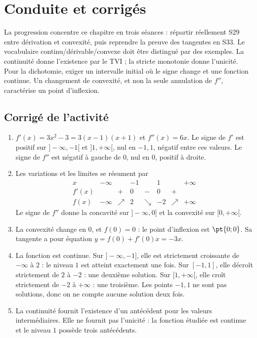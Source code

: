 \ifmxteacher\mxnewpage\section{Conduite et corrigés}\begin{teachernote}La progression concentre ce chapitre en trois séances : répartir réellement S29 entre dérivation et convexité, puis reprendre la preuve des tangentes en S33. Le vocabulaire continu/dérivable/convexe doit être distingué par des exemples. La continuité donne l'existence par le TVI ; la stricte monotonie donne l'unicité. Pour la dichotomie, exiger un intervalle initial où le signe change et une fonction continue. Un changement de convexité, et non la seule annulation de $f''$, caractérise un point d'inflexion.\end{teachernote}

\subsection{Corrigé de l'activité}\begin{enumerate}
\item $f'(x)=3x^2-3=3(x-1)(x+1)$ et $f''(x)=6x$. Le signe de $f'$ est positif sur $]-\infty,-1[$ et $]1,+\infty[$, nul en $-1,1$, négatif entre ces valeurs. Le signe de $f''$ est négatif à gauche de $0$, nul en $0$, positif à droite.
\item Les variations et les limites se résument par
\[\begin{array}{c|ccccccc}x&-\infty&&-1&&1&&+\infty\\\hline f'(x)&&+&0&-&0&+&\\\hline f(x)&-\infty&\nearrow&2&\searrow&-2&\nearrow&+\infty\end{array}\]
Le signe de $f''$ donne la concavité sur $]-\infty,0]$ et la convexité sur $[0,+\infty[$.
\item La convexité change en $0$, et $f(0)=0$ : le point d'inflexion est $\pt{0;0}$. Sa tangente a pour équation $y=f(0)+f'(0)x=-3x$.
\item La fonction est continue. Sur $]-\infty,-1]$, elle est strictement croissante de $-\infty$ à $2$ : le niveau $1$ est atteint exactement une fois. Sur $[-1,1]$, elle décroît strictement de $2$ à $-2$ : une deuxième solution. Sur $[1,+\infty[$, elle croît strictement de $-2$ à $+\infty$ : une troisième. Les points $-1,1$ ne sont pas solutions, donc on ne compte aucune solution deux fois.
\item La continuité fournit l'existence d'un antécédent pour les valeurs intermédiaires. Elle ne fournit pas l'unicité : la fonction étudiée est continue et le niveau $1$ possède trois antécédents.
\end{enumerate}

